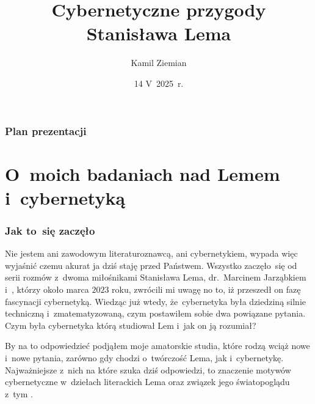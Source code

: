 \documentclass[10pt,t]{beamer}
\title{Cybernetyczne przygody Stanisława Lema}
\author{Kamil Ziemian \\
  \email}
\date[14 V~2025~r.]{14 V~2025~r.}
\begin{document}





\RaggedRight





\maketitle





\begin{frame}
  \frametitle{Plan prezentacji}


  \tableofcontents

\end{frame}










\section{O~moich badaniach nad Lemem i~cybernetyką}



\begin{frame}
  \frametitle{Jak to~się zaczęło}


  Nie jestem ani zawodowym literaturoznawcą, ani cybernetykiem, wypada więc
  wyjaśnić czemu akurat ja dziś staję przed Państwem. Wszystko
  zaczęło~się od serii rozmów z~dwoma miłośnikami Stanisława Lema,
  {dr.~Marcinem Jarząbkiem}
  i~, którzy około marca $2023$ roku, zwrócili mi uwagę no to,
  iż przeszedł on fazę fascynacji cybernetyką. Wiedząc już wtedy,
  że~cybernetyka była dziedziną silnie techniczną i~zmatematyzowaną, czym
  postawiłem sobie dwa powiązane pytania. Czym była cybernetyka którą
  studiował Lem i~jak on ją rozumiał?

  By na to odpowiedzieć podjąłem moje amatorskie studia, które
  rodzą wciąż nowe i~nowe pytania, zarówno gdy chodzi o~twórczość Lema,
  jak i~cybernetykę. Najważniejsze z~nich na które szuka dziś odpowiedzi, to
  znaczenie motywów cybernetyczne w~dziełach literackich Lema oraz związek
  jego światopoglądu z~tym
  .

\end{frame}
\end{document}
